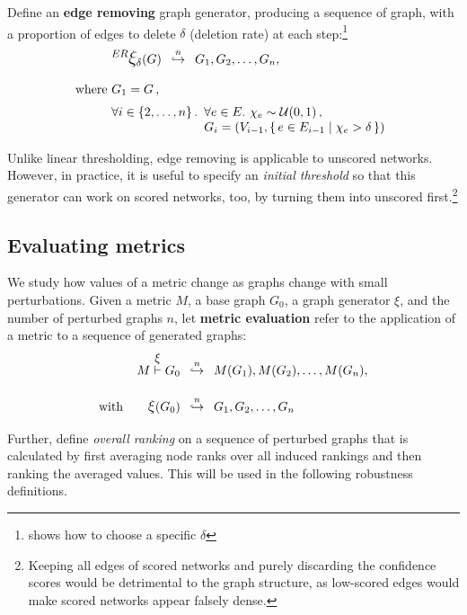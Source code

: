 Define an \textbf{edge removing} graph generator, producing a sequence of graph, with a proportion of edges to delete $\delta$ (deletion rate) at each step:\footnote{ shows how to choose a specific $\delta$}
\begin{align}
    &\mathlarger{^{ER} \mathlarger{\xi}}_\delta(G) \generates{n} G_1, G_2, \dots, G_n, \label{eq:edge_removing_generator}\\[6pt]
    \text{where}~& G_1 = G\,, \nonumber \\
    & \forall i \in \left\{2, \dots, n\right\}. \begin{array}[t]{l}
                                                    \forall e \in E.\ \chi_e\sim\mathcal{U}(0,1)\,, \\ G_i = \left( V_{i-1}, \Set{ e \in E_{i-1} }{ \chi_e > \delta }  \right)
    \end{array} \nonumber
\end{align}

Unlike linear thresholding, edge removing is applicable to unscored networks.
However, in practice, it is useful to specify an \textsl{initial threshold} so that this generator can work on scored networks, too, by turning them into unscored first.\footnote{Keeping all edges of scored networks and purely discarding the confidence scores would be detrimental to the graph structure, as low-scored edges would make scored networks appear falsely dense.}

\subsection{Evaluating metrics}\label{sec:evaluating_metrics}

We study how values of a metric change as graphs change with small perturbations.
Given a metric $M$, a base graph $G_0$, a graph generator $\xi$, and the number of perturbed graphs $n$, let \textbf{metric evaluation} refer to the application of a metric to a sequence of generated graphs:
\begin{align}
    M \overset{\mathlarger{\xi}}{\vdash} G_0 &\generates{n} M(G_1), M(G_2), \dots, M(G_n), \\[10pt]
    \text{with}\qquad \mathlarger{\xi}(G_0) &\generates{n} G_1, G_2, \dots, G_n \nonumber
\end{align}

Further, define \textsl{overall ranking} on a sequence of perturbed graphs that is calculated by first averaging node ranks over all induced rankings and then ranking the averaged values.
This will be used in the following robustness definitions.


